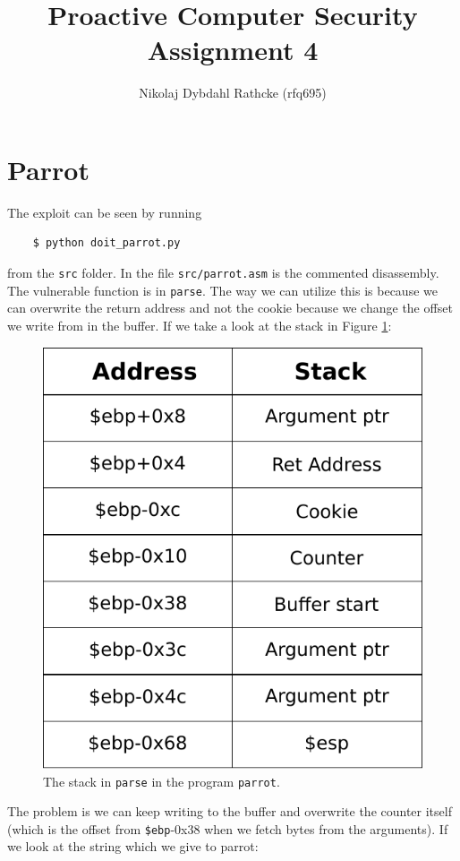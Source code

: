 \documentclass[a4paper]{article}
\author{Nikolaj Dybdahl Rathcke (rfq695)}
\title{Proactive Computer Security \\ Assignment 4}
\begin{document}
\maketitle

\section{Parrot}
The exploit can be seen by running
\begin{verbatim}
    $ python doit_parrot.py
\end{verbatim}
from the \texttt{src} folder. In the file \texttt{src/parrot.asm} is the commented disassembly. The vulnerable function is in \texttt{parse}. The way we can utilize this is because we can overwrite the return address and not the cookie because we change the offset we write from in the buffer. If we take a look at the stack in Figure \ref{1}:
\begin{figure}[H]
  \centering
  \includegraphics[scale=0.7]{stack1}
  \caption{The stack in \texttt{parse} in the program \texttt{parrot}.}
  \label{1}
\end{figure}
The problem is we can keep writing to the buffer and overwrite the counter itself (which is the offset from \texttt{\$ebp}-0x38 when we fetch bytes from the arguments). If we look at the string which we give to parrot:
\end{document}
